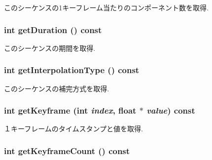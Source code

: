 このシーケンスの1キーフレーム当たりのコンポーネント数を取得. \hypertarget{classm3g_1_1KeyframeSequence_995a5ca5c8c3c993ef167f67cbb5fabe}{
\subsubsection[{getDuration}]{\setlength{\rightskip}{0pt plus 5cm}int getDuration () const}}
\label{classm3g_1_1KeyframeSequence_995a5ca5c8c3c993ef167f67cbb5fabe}


このシーケンスの期間を取得. \hypertarget{classm3g_1_1KeyframeSequence_0d46321e7f46e037508cce88cdf6a487}{
\subsubsection[{getInterpolationType}]{\setlength{\rightskip}{0pt plus 5cm}int getInterpolationType () const}}
\label{classm3g_1_1KeyframeSequence_0d46321e7f46e037508cce88cdf6a487}


このシーケンスの補完方式を取得. \hypertarget{classm3g_1_1KeyframeSequence_0fd27047149eedab8b10319768e1fe9a}{
\subsubsection[{getKeyframe}]{\setlength{\rightskip}{0pt plus 5cm}int getKeyframe (int {\em index}, \/  float $\ast$ {\em value}) const}}
\label{classm3g_1_1KeyframeSequence_0fd27047149eedab8b10319768e1fe9a}


１キーフレームのタイムスタンプと値を取得. \hypertarget{classm3g_1_1KeyframeSequence_4d500a603f25adafd8e6f8b68872dbff}{
\subsubsection[{getKeyframeCount}]{\setlength{\rightskip}{0pt plus 5cm}int getKeyframeCount () const}}
\label{classm3g_1_1KeyframeSequence_4d500a603f25adafd8e6f8b68872dbff}



